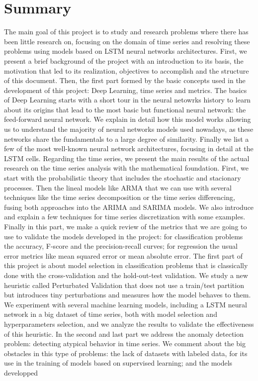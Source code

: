 %

\chapter*{Summary}\label{ch:summary}

The main goal of this project is to study and research problems where there has been little research on, focusing on the domain of time series and resolving these problems using models based on LSTM neural networks architectures. First, we present a brief background of the project with an introduction to its basis, the motivation that led to its realization, objectives to accomplish and the structure of this document. Then, the first part formed by the basic concepts used in the development of this project: Deep Learning, time series and metrics. The basics of Deep Learning starts with a short tour in the neural netowrks history to learn about its origins that lead to the most basic but functional neural network: the feed-forward neural network. We explain in detail how this model works allowing us to understand the majority of neural networks models used nowadays, as these networks share the fundamentals to a large degree of similarity. Finally we list a few of the most well-known neural network architectures, focusing in detail at the LSTM cells. Regarding the time series, we present the main results of the actual research on the time series analysis with the mathematical foundation. First, we start with the probabilistic theory that includes the stochastic and stacionary processes. Then the lineal models like ARMA that we can use with several techniques like the time series decomposition or the time series differencing, fusing both approaches into the ARIMA and SARIMA models. We also introduce and explain a few techniques for time series discretization with some examples. Finally in this part, we make a quick review of the metrics that we are going to use to validate the models developed in the project: for classification problems the accuracy, F-score and the precision-recall curves; for regression the usual error metrics like mean squared error or mean absolute error. The first part of this project is about model selection in classification problems that is classically done with the cross-validation and the hold-out-test validation. We study a new heuristic called Perturbated Validation that does not use a train/test partition but introduces tiny perturbations and measures how the model behaves to them. We experiment with several machine learning models, including a LSTM neural network in a big dataset of time series, both with model selection and hyperparameters selection, and we analyze the results to validate the effectiveness of this heuristic. In the second and last part we address the anomaly detection problem: detecting atypical behavior in time series. We comment about the big obstacles in this type of problems: the lack of datasets with labeled data, for its use in the training of models based on supervised learning; and the models developped 